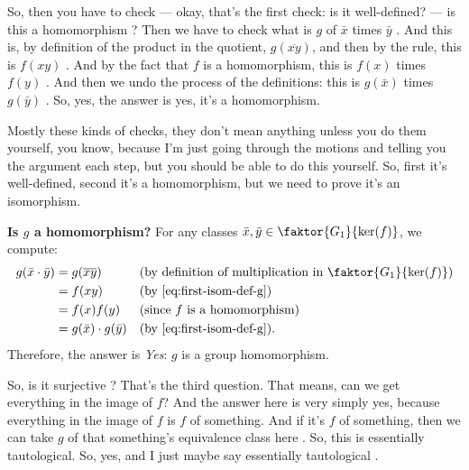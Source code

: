 \begin{proofWrapper}
\begin{speech}[00:07:08 - 00:08:16]
So, then you have to check --- okay, that's the first check: is it well-defined? --- is this a homomorphism ? Then we have to check what is $g$ of $\bar{x}$ times $\bar{y}$ . And this is, by definition of the product in the quotient, $g(\overline{xy})$, and then by the rule, this is $f(xy)$ . And by the fact that $f$ is a homomorphism, this is $f(x)$ times $f(y)$ . And then we undo the process of the definitions: this is $g(\bar{x})$ times $g(\bar{y})$ . So, yes, the answer is yes, it's a homomorphism.

Mostly these kinds of checks, they don't mean anything unless you do them yourself, you know, because I'm just going through the motions and telling you the argument each step, but you should be able to do this yourself. So, first it's well-defined, second it's a homomorphism, but we need to prove it's an isomorphism.
\end{speech}

\begin{content}
\textbf{Is $g$ a homomorphism?} For any classes $\bar{x}, \bar{y} \in \faktor{G_1}{\ker(f)}$, we compute:
\begin{align}
g(\bar{x} \cdot \bar{y}) &= g(\overline{xy}) && \text{(by definition of multiplication in $\faktor{G_1}{\ker(f)}$)} \nonumber \\
&= f(xy) && \text{(by \eqref{eq:first-isom-def-g})} \nonumber \\
&= f(x) f(y) && \text{(since $f$ is a homomorphism)} \nonumber \\
&= g(\bar{x}) \cdot g(\bar{y}) && \text{(by \eqref{eq:first-isom-def-g})}. \label{eq:first-isom-hom}
\end{align}
Therefore, the answer is \emph{Yes}: $g$ is a group homomorphism.
\end{content}

\begin{speech}[00:08:16 - 00:08:52]
So, is it surjective ? That's the third question. That means, can we get everything in the image of $f$? And the answer here is very simply yes, because everything in the image of $f$ is $f$ of something. And if it's $f$ of something, then we can take $g$ of that something's equivalence class here . So, this is essentially tautological. So, yes, and I just maybe say essentially tautological .
\end{speech}


\end{proofWrapper}
